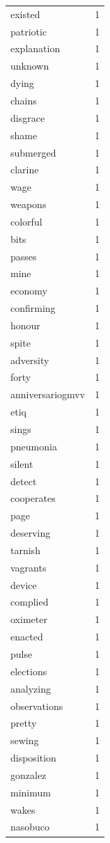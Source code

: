 \begin{tabular}{lr}
existed & 1 \\
patriotic & 1 \\
explanation & 1 \\
unknown & 1 \\
dying & 1 \\
chains & 1 \\
disgrace & 1 \\
shame & 1 \\
submerged & 1 \\
clarine & 1 \\
wage & 1 \\
weapons & 1 \\
colorful & 1 \\
bits & 1 \\
passes & 1 \\
mine & 1 \\
economy & 1 \\
confirming & 1 \\
honour & 1 \\
spite & 1 \\
adversity & 1 \\
forty & 1 \\
anniversariogmvv & 1 \\
etiq & 1 \\
sings & 1 \\
pneumonia & 1 \\
silent & 1 \\
detect & 1 \\
cooperates & 1 \\
page & 1 \\
deserving & 1 \\
tarnish & 1 \\
vagrants & 1 \\
device & 1 \\
complied & 1 \\
oximeter & 1 \\
enacted & 1 \\
pulse & 1 \\
elections & 1 \\
analyzing & 1 \\
observations & 1 \\
pretty & 1 \\
sewing & 1 \\
disposition & 1 \\
gonzalez & 1 \\
minimum & 1 \\
wakes & 1 \\
nasobuco & 1 \\

\end{tabular}
